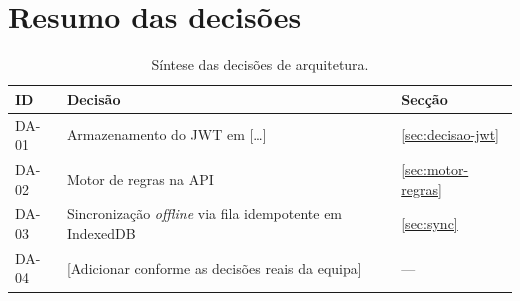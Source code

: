 \section{Resumo das decisões}
\label{sec:resumo-decisoes}


\begin{table}[H]
\centering
\caption{Síntese das decisões de arquitetura.}
\label{tab:decisoes}
\renewcommand{\arraystretch}{1.3}
\begin{tabularx}{\linewidth}{l X l}
\toprule
\textbf{ID} & \textbf{Decisão} & \textbf{Secção} \\
\midrule
DA-01 & Armazenamento do JWT em [\dots]                              & \ref{sec:decisao-jwt} \\
DA-02 & Motor de regras na API                                       & \ref{sec:motor-regras} \\
DA-03 & Sincronização \emph{offline} via fila idempotente em IndexedDB & \ref{sec:sync} \\
DA-04 & [Adicionar conforme as decisões reais da equipa]             & --- \\
\bottomrule
\end{tabularx}
\end{table}
